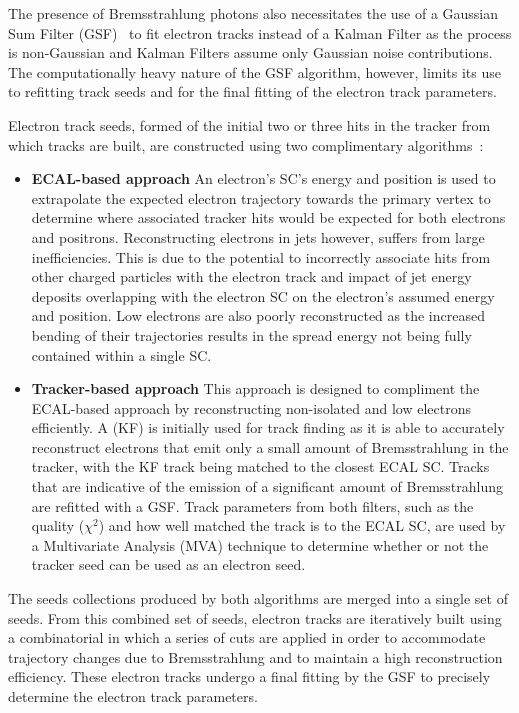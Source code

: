 The presence of Bremsstrahlung photons also necessitates the use of a Gaussian Sum Filter (GSF)~\cite{Adam:2003eca} to fit electron tracks instead of a Kalman Filter as the process is non-Gaussian and Kalman Filters assume only Gaussian noise contributions.
The computationally heavy nature of the GSF algorithm, however, limits its use to refitting \KF track seeds and for the final fitting of the electron track parameters.

Electron track seeds, formed of the initial two or three hits in the tracker from which tracks are built, are constructed using two complimentary algorithms~\cite{Khachatryan:2015hwa}:
\begin{itemize}
\item \textbf{ECAL-based approach} An electron's SC's energy and position is used to extrapolate the expected electron trajectory towards the primary vertex to determine where associated tracker hits would be expected for both electrons and positrons.
Reconstructing electrons in jets however, suffers from large inefficiencies. 
This is due to the potential to incorrectly associate hits from other charged particles with the electron track and impact of jet energy deposits overlapping with the electron SC on the electron's assumed energy and position.
Low \pT electrons are also poorly reconstructed as the increased bending of their trajectories results in the spread energy not being fully contained within a single SC.

\item \textbf{Tracker-based approach} This approach is designed to compliment the ECAL-based approach by reconstructing non-isolated and low \pT electrons efficiently.
A \KF (KF) is initially used for track finding as it is able to accurately reconstruct electrons that emit only a small amount of Bremsstrahlung in the tracker, with the KF track being matched to the closest ECAL SC.
Tracks that are indicative of the emission of a significant amount of Bremsstrahlung are refitted with a GSF.
Track parameters from both filters, such as the quality ($\chi^{2}$) and how well matched the track is to the ECAL SC, are used by a Multivariate Analysis (MVA) technique to determine whether or not the tracker seed can be used as an electron seed.
\end{itemize}

The seeds collections produced by both algorithms are merged into a single set of seeds.
From this combined set of seeds, electron tracks are iteratively built using a combinatorial \KF in which a series of cuts are applied in order to accommodate trajectory changes due to Bremsstrahlung and to maintain a high reconstruction efficiency.
These electron tracks undergo a final fitting by the GSF to precisely determine the electron track parameters.
 
